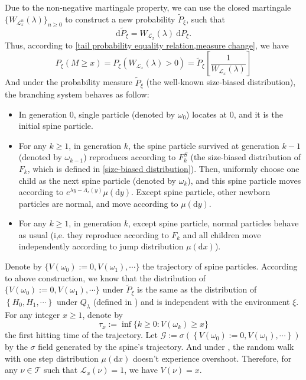 \documentclass[]{article}
\numberwithin{equation}{section}
\theoremstyle{thmstyleone}%
\theoremstyle{thmstyletwo}%
\theoremstyle{thmstylethree}%
\theoremstyle{thmstylefour}%
\theoremstyle{thmstylefive}%
\theoremstyle{thmstylesix}%
\renewcommand{\d}{\mathrm{d}}
\begin{document}
	
	Due to the non-negative martingale property, we can use the closed martingale $\{W_{\mathcal{L}_x^n}(\lambda)\}_{n\geqslant 0}$ to construct a new probability $\tilde{P}_\xi$, such that
	\begin{equation}\label{measure change}
		\d \tilde{P}_\xi = W_{\mathcal{L}_x}(\lambda) ~\d P_\xi.
	\end{equation}
	Thus, according to \cref{tail probability equality relation,measure change}, we have
	\begin{equation}\label{2.10}
		P_\xi (M\geqslant x) = P_\xi (W_{\mathcal{L}_x}(\lambda)>0) = \tilde{P}_\xi\left[\frac{1}{W_{\mathcal{L}_x}(\lambda)}\right]
	\end{equation}
	And under the probability measure $\tilde{P}_\xi$ (the well-known size-biased distribution), the branching system behaves as follow:
	\begin{itemize}
		\item In generation 0, single particle (denoted by $\omega_0$) locates at $0$, and it is the initial spine particle.
		\item For any $k\geqslant1$, in generation $k$, 
		the spine particle survived at generation $k-1$ (denoted by $\omega_{k-1}$) reproduces according to $F^S_k$ (the size-biased distribution of $F_k$, which is defined in \cref{size-biased distribution}). Then, uniformly choose one child as the next spine particle (denoted by $\omega_k$), and this spine particle moves according to $ e^{\lambda y-\Lambda_s(y)} \mu(\d y)$. Except spine particle, other newborn particles are normal, and move according to $\mu(\d y)$.
		\item For any $k\geqslant1$, in generation $k$, except spine particle, normal particles behave as usual (i,e. they reproduce according to $F_k$ and all children move independently according to jump distribution $\mu(\d x)$).
	\end{itemize}
	
	Denote by $\{V(\omega_0):=0,V(\omega_1),\cdots\}$ the trajectory of spine particles. According to above construction, we know that the distribution of $ \{V(\omega_0):=0,V(\omega_1),\cdots\} $ under $\tilde{P}_\xi$ is the same as the distribution of $\left\{H_0,H_1,\cdots\right\}$ under $Q_\lambda$ (defined in ) and is independent with the environment $\xi$.
	For any integer $x\geqslant1$, denote by \begin{equation}\label{first hitting time}
		\tau_x:=\inf\{k\geqslant0:V(\omega_k)\geqslant x\}
	\end{equation} the first hitting time of the trajectory.
	Let $\mathcal{G}:= \sigma\left(\left\{V(\omega_0):=0,V(\omega_1),\cdots\right\}\right)$ by the $\sigma$ field generated by the spine's trajectory.
	And under , the random walk with one step distribution $\mu(\d x)$ doesn't experience overshoot. Therefore, for any $\nu\in\mathcal{T}$ such that $\mathcal{L}_x(\nu) =1$, we have $V(\nu) = x$.
	
\end{document}
